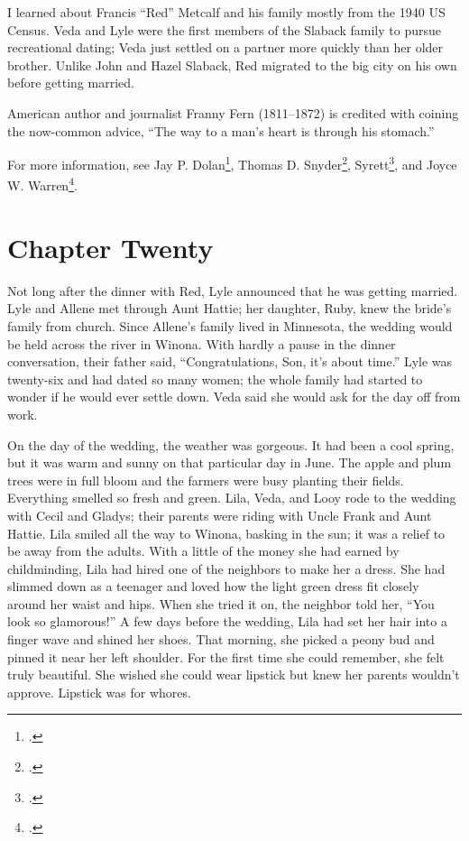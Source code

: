 \documentclass[
  letterpaper,
]{book}
\begin{document}
I learned about Francis ``Red'' Metcalf and his family mostly from the
1940 US Census. Veda and Lyle were the first members of the Slaback
family to pursue recreational dating; Veda just settled on a partner
more quickly than her older brother. Unlike John and Hazel Slaback, Red
migrated to the big city on his own before getting married.

American author and journalist Franny Fern (1811--1872) is credited with
coining the now-common advice, ``The way to a man's heart is through his
stomach.''

For more information, see Jay P. Dolan\footnote{.},
Thomas D. Snyder\footnote{.}, Syrett\footnote{.}, and Joyce W. Warren\footnote{.}.


\chapter{Chapter Twenty}\label{chapter-twenty}

Not long after the dinner with Red, Lyle announced that he was getting
married. Lyle and Allene met through Aunt Hattie; her daughter, Ruby,
knew the bride's family from church. Since Allene's family lived in
Minnesota, the wedding would be held across the river in Winona. With
hardly a pause in the dinner conversation, their father said,
``Congratulations, Son, it's about time.'' Lyle was twenty-six and had
dated so many women; the whole family had started to wonder if he would
ever settle down. Veda said she would ask for the day off from work.

On the day of the wedding, the weather was gorgeous. It had been a cool
spring, but it was warm and sunny on that particular day in June. The
apple and plum trees were in full bloom and the farmers were busy
planting their fields. Everything smelled so fresh and green. Lila,
Veda, and Looy rode to the wedding with Cecil and Gladys; their parents
were riding with Uncle Frank and Aunt Hattie. Lila smiled all the way to
Winona, basking in the sun; it was a relief to be away from the adults.
With a little of the money she had earned by childminding, Lila had
hired one of the neighbors to make her a dress. She had slimmed down as
a teenager and loved how the light green dress fit closely around her
waist and hips. When she tried it on, the neighbor told her, ``You look
so glamorous!'' A few days before the wedding, Lila had set her hair
into a finger wave and shined her shoes. That morning, she picked a
peony bud and pinned it near her left shoulder. For the first time she
could remember, she felt truly beautiful. She wished she could wear
lipstick but knew her parents wouldn't approve. Lipstick was for whores.
\end{document}
